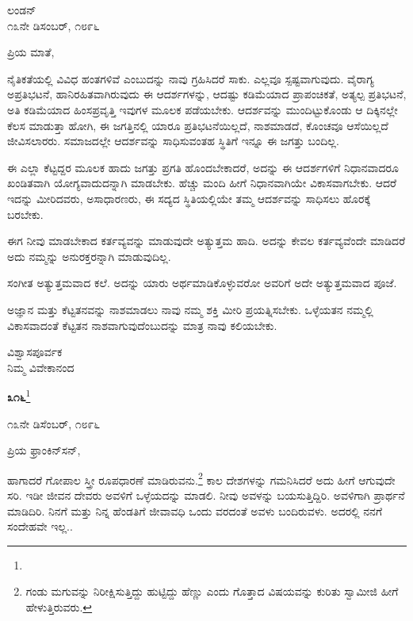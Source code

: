 \begin{flushright}
ಲಂಡನ್\\೧೩ನೇ ಡಿಸಂಬರ್, ೧೮೯೬
\end{flushright}

\noindent
ಪ್ರಿಯ ಮಾತೆ,

ನೈತಿಕತೆಯಲ್ಲಿ ವಿವಿಧ ಹಂತಗಳಿವೆ ಎಂಬುದನ್ನು ನಾವು ಗ್ರಹಿಸಿದರೆ ಸಾಕು. ಎಲ್ಲವೂ ಸ್ಪಷ್ಟವಾಗುವುದು. ವೈರಾಗ್ಯ\enginline{-} ಅಪ್ರತಿಭಟನೆ, ಹಾನಿರಹಿತವಾಗಿರುವುದು\enginline{-} ಈ ಆದರ್ಶಗಳನ್ನು, ಆದಷ್ಟು ಕಡಿಮೆಯಾದ ಪ್ರಾಪಂಚಿಕತೆ, ಅತ್ಯಲ್ಪ ಪ್ರತಿಭಟನೆ, ಅತಿ ಕಡಿಮೆಯಾದ ಹಿಂಸಪ್ರವೃತ್ತಿ\enginline{-} ಇವುಗಳ ಮೂಲಕ ಪಡೆಯಬೇಕು. ಆದರ್ಶವನ್ನು ಮುಂದಿಟ್ಟುಕೊಂಡು ಆ ದಿಕ್ಕಿನಲ್ಲೇ ಕೆಲಸ ಮಾಡುತ್ತಾ ಹೋಗಿ, ಈ ಜಗತ್ತಿನಲ್ಲಿ ಯಾರೂ ಪ್ರತಿಭಟನೆಯಿಲ್ಲದೆ, ನಾಶಮಾಡದೆ, ಕೊಂಚವೂ ಆಸೆಯಿಲ್ಲದೆ ಜೀವಿಸಲಾರರು. ಸಮಾಜದಲ್ಲೇ ಆದರ್ಶವನ್ನು ಸಾಧಿಸುವಂತಹ ಸ್ಥಿತಿಗೆ ಇನ್ನೂ ಈ ಜಗತ್ತು ಬಂದಿಲ್ಲ.

ಈ ಎಲ್ಲಾ ಕೆಟ್ಟದ್ದರ ಮೂಲಕ ಹಾದು ಜಗತ್ತು ಪ್ರಗತಿ ಹೊಂದಬೇಕಾದರೆ, ಅದನ್ನು ಈ ಆದರ್ಶಗಳಿಗೆ ನಿಧಾನವಾದರೂ ಖಂಡಿತವಾಗಿ ಯೋಗ್ಯವಾದುದನ್ನಾಗಿ ಮಾಡಬೇಕು. ಹೆಚ್ಚು ಮಂದಿ ಹೀಗೆ ನಿಧಾನವಾಗಿಯೇ ವಿಕಾಸವಾಗಬೇಕು. ಆದರೆ ಇದನ್ನು ಮೀರಿದವರು, ಅಸಾಧಾರಣರು, ಈ ಸದ್ಯದ ಸ್ಥಿತಿಯಲ್ಲಿಯೇ ತಮ್ಮ ಆದರ್ಶವನ್ನು ಸಾಧಿಸಲು ಹೊರಕ್ಕೆ ಬರಬೇಕು.

ಈಗ ನೀವು ಮಾಡಬೇಕಾದ ಕರ್ತವ್ಯವನ್ನು ಮಾಡುವುದೇ ಅತ್ಯುತ್ತಮ ಹಾದಿ. ಅದನ್ನು ಕೇವಲ ಕರ್ತವ್ಯವೆಂದೇ ಮಾಡಿದರೆ ಅದು ನಮ್ಮನ್ನು ಅನುರಕ್ತರನ್ನಾಗಿ ಮಾಡುವುದಿಲ್ಲ.

ಸಂಗೀತ ಅತ್ಯುತ್ತಮವಾದ ಕಲೆ. ಅದನ್ನು ಯಾರು ಅರ್ಥಮಾಡಿಕೊಳ್ಳುವರೋ ಅವರಿಗೆ ಅದೇ ಅತ್ಯುತ್ತಮವಾದ ಪೂಜೆ.

ಅಜ್ಞಾನ ಮತ್ತು ಕೆಟ್ಟತನವನ್ನು ನಾಶಮಾಡಲು ನಾವು ನಮ್ಮ ಶಕ್ತಿ ಮೀರಿ ಪ್ರಯತ್ನಿಸಬೇಕು. ಒಳ್ಳೆಯತನ ನಮ್ಮಲ್ಲಿ ವಿಕಾಸವಾದಂತೆ ಕೆಟ್ಟತನ ನಾಶವಾಗುವುದೆಂಬುದನ್ನು ಮಾತ್ರ ನಾವು ಕಲಿಯಬೇಕು.

\vspace{-0.25cm}

{\flushright
ವಿಶ್ವಾಸಪೂರ್ವಕ\\ನಿಮ್ಮ ವಿವೇಕಾನಂದ\par}

\begin{center}
\textbf{೩೧೬}\footnote{}
\end{center}

\vspace{-0.25cm}

\begin{flushright}
೧೩ನೇ ಡಿಸೆಂಬರ್, ೧೮೯೬
\end{flushright}

\vspace{-0.2cm}

\noindent
ಪ್ರಿಯ ಫ್ರಾಂಕಿನ್‌ಸನ್,

ಹಾಗಾದರೆ ಗೋಪಾಲ ಸ್ತ್ರೀ ರೂಪಧಾರಣೆ ಮಾಡಿರುವನು.\footnote{ಗಂಡು ಮಗುವನ್ನು ನಿರೀಕ್ಷಿಸುತ್ತಿದ್ದು ಹುಟ್ಟಿದ್ದು ಹೆಣ್ಣು ಎಂದು ಗೊತ್ತಾದ ವಿಷಯವನ್ನು ಕುರಿತು ಸ್ವಾಮೀಜಿ ಹೀಗೆ ಹೇಳುತ್ತಿರುವರು.} ಕಾಲ ದೇಶಗಳನ್ನು ಗಮನಿಸಿದರೆ ಅದು ಹೀಗೆ ಆಗುವುದೇ ಸರಿ. ಇಡೀ ಜೀವನ ದೇವರು ಅವಳಿಗೆ ಒಳ್ಳೆಯದನ್ನು ಮಾಡಲಿ. ನೀವು ಅವಳನ್ನು ಬಯಸುತ್ತಿದ್ದಿರಿ. ಅವಳಿಗಾಗಿ ಪ್ರಾರ್ಥನೆ ಮಾಡಿದಿರಿ. ನಿನಗೆ ಮತ್ತು ನಿನ್ನ ಹೆಂಡತಿಗೆ ಜೀವಾವಧಿ ಒಂದು ವರದಂತೆ ಅವಳು ಬಂದಿರುವಳು. ಅದರಲ್ಲಿ ನನಗೆ ಸಂದೇಹವೇ ಇಲ್ಲ..

